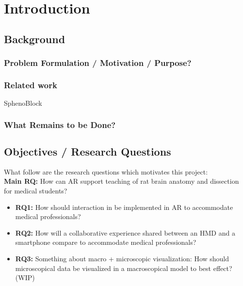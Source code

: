 \chapter{Introduction}

\section{Background}

\subsection*{Problem Formulation / Motivation / Purpose?}

\subsection*{Related work}
SphenoBlock

\subsection*{What Remains to be Done?}
\section{Objectives / Research Questions}
What follow are the research questions which motivates this project: \\ 
\newline
\noindent
\textbf{Main RQ:} How can AR support teaching of rat brain anatomy and dissection for medical students?
\begin{itemize}
    \item {
        \textbf{RQ1:} How should interaction in be implemented in AR to accommodate medical professionals?
    }
    \item {
        \textbf{RQ2:} How will a collaborative experience shared between an HMD and a smartphone compare to accommodate medical professionals?
    }
    \item {
        \color{BrickRed}
        \textbf{RQ3: }
        Something about macro + microscopic visualization:
        How should microscopical data be visualized in a macroscopical model to best effect? (WIP)
    }
\end{itemize}


